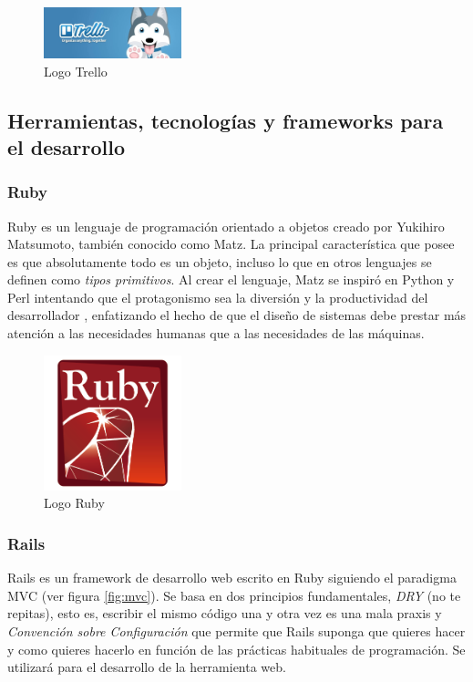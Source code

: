 		\begin{figure}[H]
		\centering
		\includegraphics[width=40mm, fbox={\fboxrule} 4mm]{images/04-metodo/21-trello_logo.jpg}
		\caption{Logo Trello}
		\label{fig:trello-logo}
		\end{figure}
		
	\subsection{Herramientas, tecnologías y frameworks para el desarrollo}
		\subsubsection{Ruby}
		Ruby es un lenguaje de programación orientado a objetos creado por Yukihiro Matsumoto, también conocido como Matz. La principal característica que posee es que absolutamente todo es un objeto, incluso lo que en otros lenguajes se definen como \textit{tipos primitivos}. Al crear el lenguaje, Matz se inspiró en Python y Perl intentando que el protagonismo sea la diversión y la productividad del desarrollador \cite{Yuki20}, enfatizando el hecho de que el diseño de sistemas debe prestar más atención a las necesidades humanas que a las necesidades de las máquinas.
		
		\begin{figure}[H]
		\centering
		\includegraphics[width=40mm, fbox={\fboxrule} 4mm]{images/04-metodo/06-ruby_logo.png}
		\caption{Logo Ruby}
		\label{fig:ruby-logo}
		\end{figure}
		
		\subsubsection{Rails}
		Rails es un framework de desarrollo web escrito en Ruby siguiendo el paradigma \ac{MVC} (ver figura \ref{fig:mvc}). Se basa en dos principios fundamentales, \textit{\ac{DRY}} (no te repitas), esto es, escribir el mismo código una y otra vez es una mala praxis y \textit{Convención sobre Configuración} que permite que Rails suponga que quieres hacer y como quieres hacerlo en función de las prácticas habituales de programación. Se utilizará para el desarrollo de la herramienta web.
		
